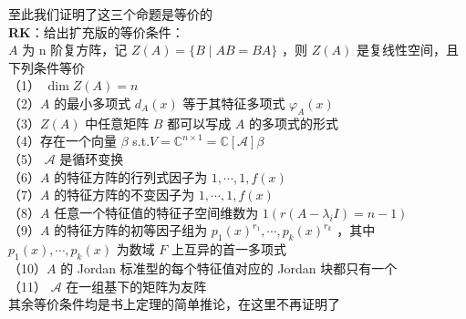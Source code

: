 \documentclass[UTF8]{ctexart}
\begin{document}
\noindent 至此我们证明了这三个命题是等价的\\



\noindent \textbf{RK}：给出扩充版的等价条件：\\
$A$ 为 n 阶复方阵，记 $Z(A)=\{B \mid A B=B A\}$ ，则 $Z(A)$ 是复线性空间，且下列条件等价\\
（1） $\operatorname{dim} Z(A)=n$\\
（2）$A$ 的最小多项式 $d_{A}(x)$ 等于其特征多项式 $\varphi_{A}(x)$\\
（3）$Z(A)$ 中任意矩阵 $B$ 都可以写成 $A$ 的多项式的形式\\
（4）存在一个向量 $\beta$ s.t.$V=\mathbb{C}^{n \times 1}=\mathbb{C}[\mathcal{A}] \beta$\\
（5） $\mathcal{A}$ 是循环变换\\
（6）$A$ 的特征方阵的行列式因子为 $1, \cdots, 1, f(x)$\\
（7）$A$ 的特征方阵的不变因子为 $1, \cdots, 1, f(x)$\\
（8）$A$ 任意一个特征值的特征子空间维数为 $1\left(r\left(A-\lambda_{i} I\right)=n-1\right)$\\
（9）$A$ 的特征方阵的初等因子组为 $p_{1}(x)^{r_{1}}, \cdots, p_{k}(x)^{r_{k}}$ ，其中 $p_{1}(x), \cdots, p_{k}(x)$ 为数域 $F$ 上互异的首一多项式\\
（10）$A$ 的 Jordan 标准型的每个特征值对应的 Jordan 块都只有一个\\
（11） $\mathcal{A}$ 在一组基下的矩阵为友阵\\
其余等价条件均是书上定理的简单推论，在这里不再证明了
\end{document}
